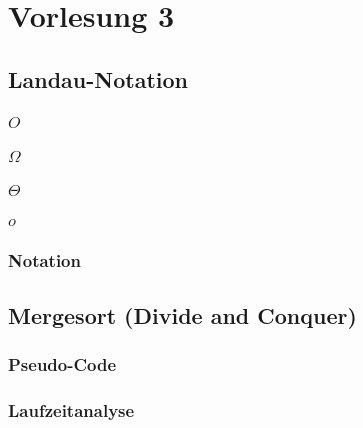 \chapter{Vorlesung 3}


\section{Landau-Notation}


\subsection{$O$}

\subsection{$\Omega$}

\subsection{$\Theta$}

\subsection{$o$}

\subsection{Notation}


\section{Mergesort (Divide and Conquer)}

\subsection{Pseudo-Code}

\subsection{Laufzeitanalyse}
